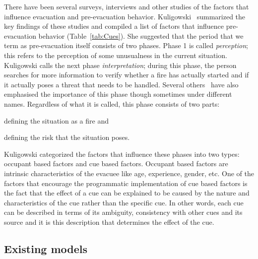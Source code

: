 There have been several surveys, interviews and other studies of the factors that influence evacuation and pre-evacuation behavior. Kuligowski~\cite{Kuligowski:2009un} summarized the key findings of these studies and compiled a list of factors that influence pre-evacuation behavior (Table~\ref{tab:Cues}). She suggested that the period that we term as pre-evacuation itself consists of two phases. Phase 1 is called \emph{perception}; this refers to the perception of some unusualness in the current situation. Kuligowski calls the next phase \emph{interpretation}; during this phase, the person searches for more information to verify whether a fire has actually started and if it actually poses a threat that needs to be handled. Several others~\cite{Ozel:2001tn,Proulx:2007ul,Tong:1985wn} have also emphasised the importance of this phase though sometimes under different names. Regardless of what it is called, this phase consists of two parts:
\begin{inparaenum}
\item defining the situation as a fire and
\item defining the risk that the situation poses.
\end{inparaenum}


Kuligowski categorized the factors that influence these phases into two types: occupant based factors and cue based factors. Occupant based factors are intrinsic characteristics of the evacuee like age, experience, gender, etc. One of the factors that encourage the programmatic implementation of cue based factors is the fact that the effect of a cue can be explained to be caused by the nature and characteristics of the cue rather than the specific cue. In other words, each cue can be described in terms of its ambiguity, consistency with other cues and its source and it is this description that determines the effect of the cue.


\subsection{Existing models}
\label{PreEvac:ExistingModels}

